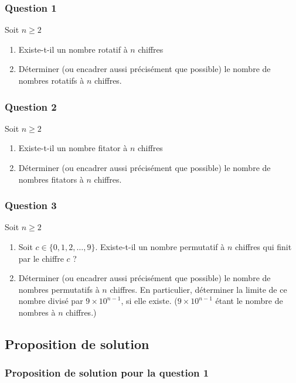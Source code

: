 \documentclass{article}
\begin{document}
\subsubsection{Question 1}

Soit $n \ge 2$
\begin{enumerate}
    \item Existe-t-il un nombre rotatif à $n$ chiffres
    \item Déterminer (ou encadrer aussi précisément que possible) le nombre de nombres rotatifs à $n$ chiffres.
\end{enumerate}

\subsubsection{Question 2}

Soit $n \ge 2$
\begin{enumerate}
    \item Existe-t-il un nombre fitator à $n$ chiffres
    \item Déterminer (ou encadrer aussi précisément que possible) le nombre de nombres fitators à $n$ chiffres.
\end{enumerate}

\subsubsection{Question 3}

Soit $n \ge 2$
\begin{enumerate}
    \item Soit $c \in \{0,1,2,\ldots,9\}$. Existe-t-il un nombre permutatif à $n$ chiffres qui finit par le chiffre $c$ ?
    \item Déterminer (ou encadrer aussi précisément que possible) le nombre de nombres permutatifs à $n$ chiffres. En particulier, déterminer la limite de ce nombre divisé par $9 \times 10^{n-1}$, si elle existe. ($9 \times 10^{n-1}$ étant le nombre de nombres à $n$ chiffres.)
\end{enumerate}

\subsection{Proposition de solution}

\subsubsection{Proposition de solution pour la question 1}
\end{document}
